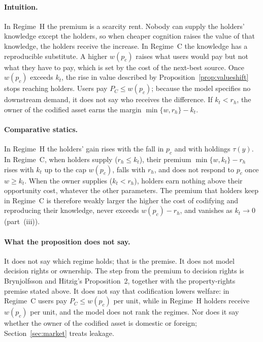 \documentclass[12pt]{article}
\theoremstyle{remark}
\begin{document}
\paragraph{Intuition.} In Regime~H the premium is a scarcity rent. Nobody can supply the holders' knowledge except the holders, so when cheaper cognition raises the value of that knowledge, the holders receive the increase. In Regime~C the knowledge has a reproducible substitute. A higher $w(p_c)$ raises what users would pay but not what they have to pay, which is set by the cost of the next-best source. Once $w(p_c)$ exceeds $k_t$, the rise in value described by Proposition~\ref{prop:valueshift} stops reaching holders. Users pay $P_C\le w(p_c)$; because the model specifies no downstream demand, it does not say who receives the difference. If $k_t<r_h$, the owner of the codified asset earns the margin $\min\{w,r_h\}-k_t$.

\paragraph{Comparative statics.} In Regime~H the holders' gain rises with the fall in $p_c$ and with holdings $\tau(y)$. In Regime~C, when holders supply ($r_h\le k_t$), their premium $\min\{w,k_t\}-r_h$ rises with $k_t$ up to the cap $w(p_c)$, falls with $r_h$, and does not respond to $p_c$ once $w\ge k_t$. When the owner supplies ($k_t<r_h$), holders earn nothing above their opportunity cost, whatever the other parameters. The premium that holders keep in Regime~C is therefore weakly larger the higher the cost of codifying and reproducing their knowledge, never exceeds $w(p_c)-r_h$, and vanishes as $k_t\to0$ (part~(iii)).

\paragraph{What the proposition does not say.} It does not say which regime holds; that is the premise. It does not model decision rights or ownership. The step from the premium to decision rights is Brynjolfsson and Hitzig's Proposition~2, together with the property-rights premise stated above. It does not say that codification lowers welfare: in Regime~C users pay $P_C\le w(p_c)$ per unit, while in Regime~H holders receive $w(p_c)$ per unit, and the model does not rank the regimes. Nor does it say whether the owner of the codified asset is domestic or foreign; Section~\ref{sec:market} treats leakage.
\end{document}
